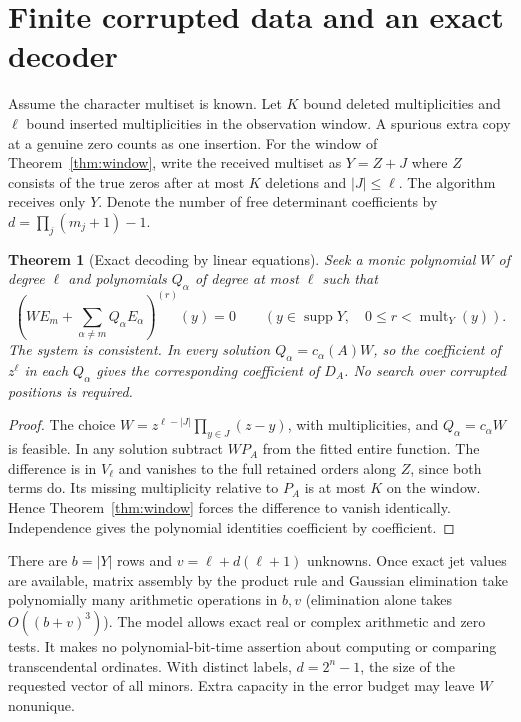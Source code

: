 \documentclass[11pt]{article}
\newtheorem{theorem}{Theorem}[section]
\theoremstyle{remark}\newtheorem{remark}[theorem]{Remark}
\begin{document}



\section{Finite corrupted data and an exact decoder}
Assume the character multiset is known. Let $K$ bound deleted multiplicities and $\ell$ bound inserted multiplicities in the observation window. A spurious extra copy at a genuine zero counts as one insertion. For the window of Theorem~\ref{thm:window}, write the received multiset as $Y=Z+J$ where $Z$ consists of the true zeros after at most $K$ deletions and $|J|\le\ell$. The algorithm receives only $Y$. Denote the number of free determinant coefficients by $d=\prod_j(m_j+1)-1$.

\begin{theorem}[Exact decoding by linear equations]\label{thm:decode}
Seek a monic polynomial $W$ of degree $\ell$ and polynomials $Q_\alpha$ of degree at most $\ell$ such that
\[
 \left(W E_m+\sum_{\alpha\ne m} Q_\alpha E_\alpha\right)^{(r)}(y)=0
 \qquad (y\in\operatorname{supp}Y,\quad 0\le r<\operatorname{mult}_Y(y)).
\]
The system is consistent. In every solution $Q_\alpha=c_\alpha(A)W$, so the coefficient of $z^\ell$ in each $Q_\alpha$ gives the corresponding coefficient of $D_A$. No search over corrupted positions is required.
\end{theorem}
\begin{proof}
The choice $W=z^{\ell-|J|}\prod_{y\in J}(z-y)$, with multiplicities, and $Q_\alpha=c_\alpha W$ is feasible. In any solution subtract $WP_A$ from the fitted entire function. The difference is in $V_\ell$ and vanishes to the full retained orders along $Z$, since both terms do. Its missing multiplicity relative to $P_A$ is at most $K$ on the window. Hence Theorem~\ref{thm:window} forces the difference to vanish identically. Independence gives the polynomial identities coefficient by coefficient.
\end{proof}
There are $b=|Y|$ rows and $v=\ell+d(\ell+1)$ unknowns. Once exact jet values are available, matrix assembly by the product rule and Gaussian elimination take polynomially many arithmetic operations in $b,v$ (elimination alone takes $O((b+v)^3)$). The model allows exact real or complex arithmetic and zero tests. It makes no polynomial-bit-time assertion about computing or comparing transcendental ordinates. With distinct labels, $d=2^n-1$, the size of the requested vector of all minors. Extra capacity in the error budget may leave $W$ nonunique.
\end{document}
